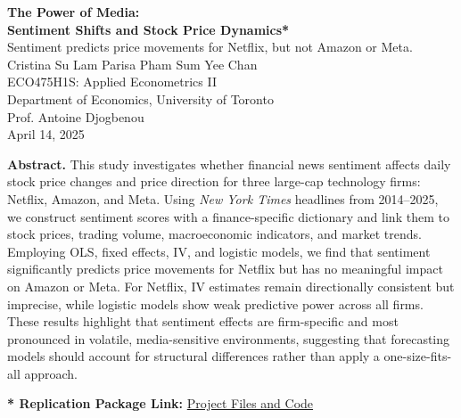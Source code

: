 \documentclass[12pt]{article}
\begin{document}
\thispagestyle{empty}
\begin{center}
\vspace*{1cm}

{\Large \textbf{The Power of Media: \\
Sentiment Shifts and Stock Price Dynamics*}}\\[0.5em]

{Sentiment predicts price movements for Netflix, but not Amazon or Meta.
}\\[1cm]

Cristina Su Lam \hspace{1.5cm} Parisa Pham \hspace{1.5cm} Sum Yee Chan\\[0.5cm]
ECO475H1S: Applied Econometrics II\\
Department of Economics, University of Toronto\\
Prof. Antoine Djogbenou\\[0.5cm]
April 14, 2025
\end{center}

\vspace*{1cm}
\begin{center}
\begin{minipage}{0.9\textwidth}
\noindent\textbf{Abstract.} 
This study investigates whether financial news sentiment affects daily stock price changes and price direction for three large-cap technology firms: Netflix, Amazon, and Meta. Using \textit{New York Times} headlines from 2014–2025, we construct sentiment scores with a finance-specific dictionary and link them to stock prices, trading volume, macroeconomic indicators, and market trends. Employing OLS, fixed effects, IV, and logistic models, we find that sentiment significantly predicts price movements for Netflix but has no meaningful impact on Amazon or Meta. For Netflix, IV estimates remain directionally consistent but imprecise, while logistic models show weak predictive power across all firms. These results highlight that sentiment effects are firm-specific and most pronounced in volatile, media-sensitive environments, suggesting that forecasting models should account for structural differences rather than apply a one-size-fits-all approach.

\end{minipage}
\end{center}

\vfill
\noindent
\footnotesize\textbf{* Replication Package Link:} \href{https://github.com/cristinaasu/sentiment_analysis/tree/main}{Project Files and Code}
\end{document}
